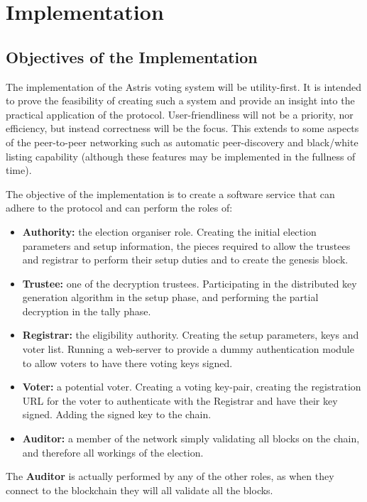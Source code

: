 
\chapter{Implementation}
\label{ch:sw}

\section{Objectives of the Implementation}
\label{ch:sw:objectives}

The implementation of the Astris voting system will be utility-first. It is intended to prove the feasibility of creating such a system and provide an insight into the practical application of the protocol. User-friendliness will not be a priority, nor efficiency, but instead correctness will be the focus. This extends to some aspects of the peer-to-peer networking such as automatic peer-discovery and black/white listing capability (although these features may be implemented in the fullness of time).

The objective of the implementation is to create a software service that can adhere to the protocol and can perform the roles of:

\begin{itemize}
    \item \textbf{Authority:} the election organiser role. Creating the initial election parameters and setup information, the pieces required to allow the trustees and registrar to perform their setup duties and to create the genesis block.
    \item \textbf{Trustee:} one of the decryption trustees. Participating in the distributed key generation algorithm in the setup phase, and performing the partial decryption in the tally phase.
    \item \textbf{Registrar:} the eligibility authority. Creating the setup parameters, keys and voter list. Running a web-server to provide a dummy authentication module to allow voters to have there voting keys signed.
    \item \textbf{Voter:} a potential voter. Creating a voting key-pair, creating the registration URL for the voter to authenticate with the Registrar and have their key signed. Adding the signed key to the chain.
    \item \textbf{Auditor:} a member of the network simply validating all blocks on the chain, and therefore all workings of the election.
\end{itemize}

The \textbf{Auditor} is actually performed by any of the other roles, as when they connect to the blockchain they will all validate all the blocks.


